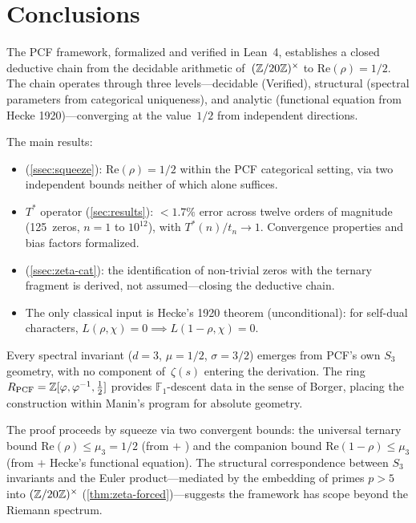 

\section{Conclusions}\label{sec:conclusions}

The PCF framework, formalized and verified in Lean~4,
establishes a closed deductive chain from the decidable
arithmetic of~$(\mathbb{Z}/20\mathbb{Z})^\times$ to $\mathrm{Re}(\rho)=1/2$.
The chain operates through three
levels---decidable (Verified), structural (spectral parameters from
categorical uniqueness), and analytic (functional equation
from Hecke 1920)---converging at the value~$1/2$ from
independent directions.

The main results:
\begin{itemize}
  \item {} (\cref{ssec:squeeze}):
    $\mathrm{Re}(\rho)=1/2$ within the PCF categorical setting, via two
    independent bounds neither of which alone suffices.
  \item $T^*$ operator (\cref{sec:results}): ${<}1.7\%$ error across twelve
    orders of magnitude (125~zeros, $n = 1$ to $10^{12}$), with $T^*(n)/t_n\to 1$.
    Convergence properties and bias factors formalized.
  \item {} (\cref{ssec:zeta-cat}):
    the identification of non-trivial zeros with the ternary fragment is
    derived, not assumed---closing the deductive chain.
  \item The only classical input is Hecke's 1920 theorem (unconditional):
    for self-dual characters, $L(\rho,\chi)=0 \implies L(1-\rho,\chi)=0$.
\end{itemize}

Every spectral invariant ($d=3$, $\mu=1/2$, $\sigma=3/2$) emerges from
PCF's own $S_3$ geometry, with no component of~$\zeta(s)$ entering the
derivation.  The ring $R_{\mathrm{PCF}} = \mathbb{Z}[\varphi,\varphi^{-1},\tfrac{1}{2}]$
provides $\mathbb{F}_1$-descent data in the sense of Borger, placing the
construction within Manin's program for absolute geometry.

The proof proceeds by squeeze via two convergent bounds: the universal
ternary bound $\mathrm{Re}(\rho)\le\mu_3=1/2$ (from
 $+$ ) and the
companion bound $\mathrm{Re}(1-\rho)\le\mu_3$ (from
 $+$ Hecke's functional equation).  The structural correspondence between $S_3$ invariants and the
Euler product---mediated by the embedding of primes $p>5$ into
$(\mathbb{Z}/20\mathbb{Z})^\times$ (\cref{thm:zeta-forced})---suggests the
framework has scope beyond the Riemann spectrum.
